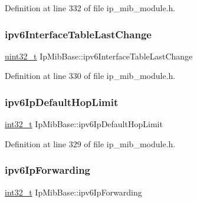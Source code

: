 Definition at line 332 of file ip\+\_\+mib\+\_\+module.\+h.

\mbox{\label{structIpMibBase_a8df557860ba74b2963de2b77b8d8fdb0}} 
\subsubsection{\texorpdfstring{ipv6\+Interface\+Table\+Last\+Change}{ipv6InterfaceTableLastChange}}
{\footnotesize\ttfamily \hyperlink{stdint_8h_a435d1572bf3f880d55459d9805097f62}{uint32\+\_\+t} Ip\+Mib\+Base\+::ipv6\+Interface\+Table\+Last\+Change}



Definition at line 330 of file ip\+\_\+mib\+\_\+module.\+h.

\mbox{\label{structIpMibBase_a1310780a8badec82eb2f12c31e57bcf5}} 
\subsubsection{\texorpdfstring{ipv6\+Ip\+Default\+Hop\+Limit}{ipv6IpDefaultHopLimit}}
{\footnotesize\ttfamily \hyperlink{stdint_8h_ab1967d8591af1a4e48c37fd2b0f184d0}{int32\+\_\+t} Ip\+Mib\+Base\+::ipv6\+Ip\+Default\+Hop\+Limit}



Definition at line 329 of file ip\+\_\+mib\+\_\+module.\+h.

\mbox{\label{structIpMibBase_a7e68d20351a09351a9c6be35e047f903}} 
\subsubsection{\texorpdfstring{ipv6\+Ip\+Forwarding}{ipv6IpForwarding}}
{\footnotesize\ttfamily \hyperlink{stdint_8h_ab1967d8591af1a4e48c37fd2b0f184d0}{int32\+\_\+t} Ip\+Mib\+Base\+::ipv6\+Ip\+Forwarding}




